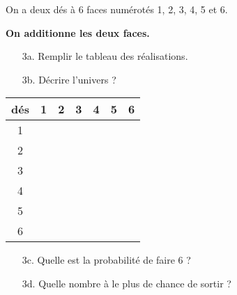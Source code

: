 \begin{multicols}{2}\noindent
  On a deux dés à 6 faces numérotés 1, 2, 3, 4, 5 et 6.
   
  \textbf{On additionne les deux faces.} 
  \begin{enumerate}
    \item[3a.] Remplir le tableau des réalisations.
    \item[3b.] Décrire l'univers ? 
  \end{enumerate}  
  \columnbreak 
  
  \begin{center}\begin{tabular}{|c|c|c|c|c|c|c|} \hline
    dés & 1 & 2 & 3 & 4 & 5 & 6 \\  \hline
      1 &   &   &   &   &   &   \\  \hline
      2 &   &   &   &   &   &   \\  \hline
      3 &   &   &   &   &   &   \\  \hline
      4 &   &   &   &   &   &   \\  \hline
      5 &   &   &   &   &   &   \\  \hline
      6 &   &   &   &   &   &   \\  \hline
  \end{tabular}\end{center}
  
  \end{multicols}
  
  \Pointilles[2] 
  \begin{enumerate}
    \item[3c.] Quelle est la probabilité de faire 6 ? \\ \Pointilles[2] 
    \item[3d.] Quelle nombre à le plus de chance de sortir ? \\ \Pointilles[2]  
  \end{enumerate}  


